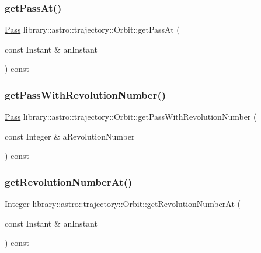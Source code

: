 \subsubsection{\texorpdfstring{get\+Pass\+At()}{getPassAt()}}
{\footnotesize\ttfamily \hyperlink{classlibrary_1_1astro_1_1trajectory_1_1orbit_1_1_pass}{Pass} library\+::astro\+::trajectory\+::\+Orbit\+::get\+Pass\+At (\begin{DoxyParamCaption}\item[{const Instant \&}]{an\+Instant }\end{DoxyParamCaption}) const}

\mbox{\label{classlibrary_1_1astro_1_1trajectory_1_1_orbit_a08833197c8d3774bf4436c1fb68c77ae}} 
\subsubsection{\texorpdfstring{get\+Pass\+With\+Revolution\+Number()}{getPassWithRevolutionNumber()}}
{\footnotesize\ttfamily \hyperlink{classlibrary_1_1astro_1_1trajectory_1_1orbit_1_1_pass}{Pass} library\+::astro\+::trajectory\+::\+Orbit\+::get\+Pass\+With\+Revolution\+Number (\begin{DoxyParamCaption}\item[{const Integer \&}]{a\+Revolution\+Number }\end{DoxyParamCaption}) const}

\mbox{\label{classlibrary_1_1astro_1_1trajectory_1_1_orbit_ad18a350be011152ca1daf597786cf464}} 
\subsubsection{\texorpdfstring{get\+Revolution\+Number\+At()}{getRevolutionNumberAt()}}
{\footnotesize\ttfamily Integer library\+::astro\+::trajectory\+::\+Orbit\+::get\+Revolution\+Number\+At (\begin{DoxyParamCaption}\item[{const Instant \&}]{an\+Instant }\end{DoxyParamCaption}) const}

